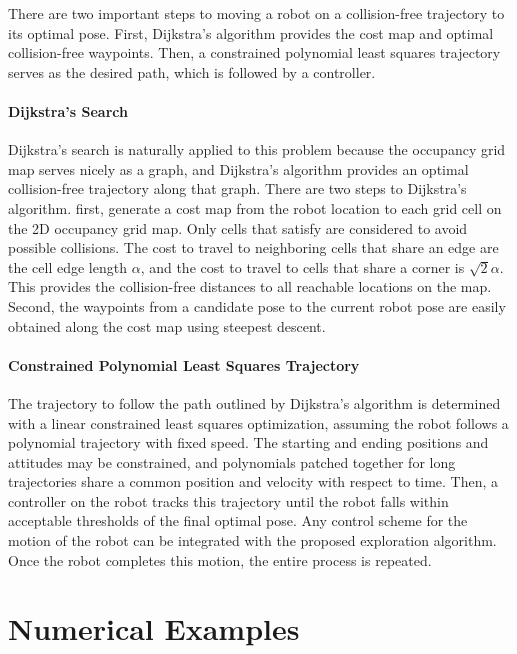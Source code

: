 There are two important steps to moving a robot on a collision-free trajectory to its optimal pose. First, Dijkstra's algorithm provides the cost map and optimal collision-free waypoints. Then, a constrained polynomial least squares trajectory serves as the desired path, which is followed by a controller.

\paragraph{Dijkstra's Search}

Dijkstra's search is naturally applied to this problem because the occupancy grid map serves nicely as a graph, and Dijkstra's algorithm provides an optimal collision-free trajectory along that graph. There are two steps to Dijkstra's algorithm. first, generate a cost map from the robot location to each grid cell on the 2D occupancy grid map. Only cells that satisfy  are considered to avoid possible collisions. The cost to travel to neighboring cells that share an edge are the cell edge length $\alpha$, and the cost to travel to cells that share a corner is $\sqrt{2}\alpha$. This provides the collision-free distances to all reachable locations on the map. Second, the waypoints from a candidate pose to the current robot pose are easily obtained along the cost map using steepest descent. 


\paragraph{Constrained Polynomial Least Squares Trajectory} The trajectory to follow the path outlined by Dijkstra's algorithm is determined with a linear constrained least squares optimization, assuming the robot follows a polynomial trajectory with fixed speed. The starting and ending positions and attitudes may be constrained, and polynomials patched together for long trajectories share a common position and velocity with respect to time. Then, a controller on the robot tracks this trajectory until the robot falls within acceptable thresholds of the final optimal pose. Any control scheme for the motion of the robot can be integrated with the proposed exploration algorithm. Once the robot completes this motion, the entire process is repeated. 

\section{Numerical Examples}


